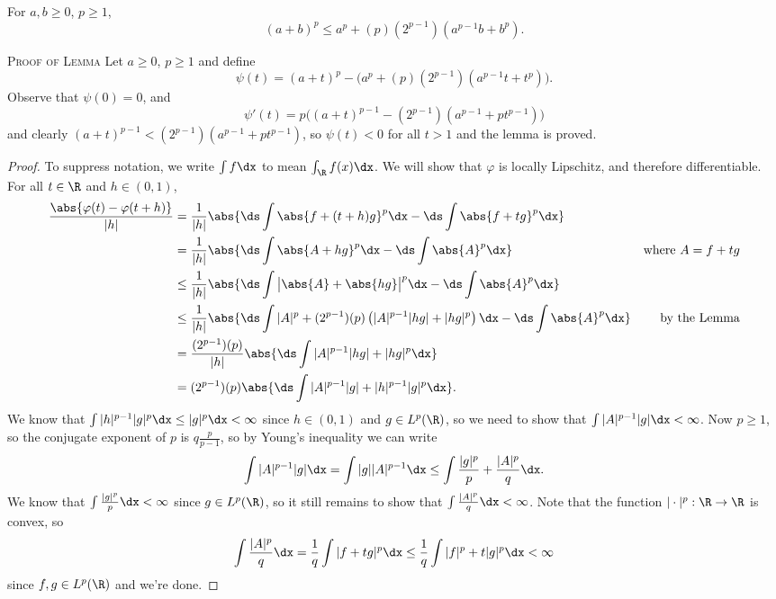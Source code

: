 \documentclass[12pt,letterpaper]{article}
\renewcommand{\phi}{\varphi}
\begin{document}
\begin{lemma}
For $a,b\geq0$, $p\geq1$, 
$$(a+b)^p\leq a^p+(p)(2^{p-1})(a^{p-1}b+b^p).$$
\end{lemma}
\textsc{Proof of Lemma} Let $a\geq0$, $p\geq1$ and define 
$$\psi(t)=(a+t)^p- \big(a^p+(p)(2^{p-1})(a^{p-1}t+t^p)\big).$$
Observe that $\psi(0)=0$, and 
$$\psi'(t)=p\big((a+t)^{p-1}- (2^{p-1})(a^{p-1}+pt^{p-1})\big)$$
and clearly $(a+t)^{p-1} < (2^{p-1})(a^{p-1}+pt^{p-1})$, so $\psi(t)<0$ for all $t>1$ and the lemma is proved. \qedwhite
\begin{proof}To suppress notation, we write $\int f\dx$ to mean $\int_\R f(x)\dx$. 
We will show that $\phi$ is locally Lipschitz, and therefore differentiable. For all $t\in \R$ and $h\in(0,1)$, 
\begin{align*}
\frac{\abs{\phi(t)-\phi(t+h)}}{|h|}
&=\frac{1}{|h|}{\abs{\ds\int\abs{f+(t+h)g}^p\dx - \ds\int\abs{f+tg}^p\dx}} \\
&=\frac{1}{|h|}{\abs{\ds\int\abs{A+hg}^p\dx - \ds\int\abs{A}^p\dx}} &\text{where }A=f+tg\\
&\leq\frac{1}{|h|}{\abs{\ds\int\big|\abs{A}+\abs{hg}\big|^p\dx - \ds\int\abs{A}^p\dx}} \\
&\leq\frac{1}{|h|}{\abs{\ds\int|A|^p+(2^{p-1})(p)\left(|A|^{p-1}|hg|+|hg|^p\right)\dx - \ds\int\abs{A}^p\dx}} &\text{by the Lemma}\\
&=\frac{(2^{p-1})(p)}{|h|}{\abs{\ds\int|A|^{p-1}|hg|+|hg|^p\dx}} \\
&={(2^{p-1})(p)}{\abs{\ds\int|A|^{p-1}|g|+|h|^{p-1}|g|^p\dx}}. \\
\end{align*}
We know that $\int|h|^{p-1}|g|^p\dx\leq |g|^p\dx<\infty$ since $h\in(0,1)$ and $g\in L^p(\R)$, so we need to show that $\int|A|^{p-1}|g|\dx<\infty$. Now $p\geq 1$, so the conjugate exponent of $p$ is $q\frac{p}{p-1}$, so by Young's inequality we can write 
$$\int|A|^{p-1}|g|\dx=\int|g||A|^{p-1}\dx\leq \int\frac{|g|^p}{p}+\frac{|A|^{p}}{q}\dx.$$
We know that $\int\frac{|g|^p}{p}\dx<\infty$ since $g\in L^p(\R)$, so it still remains to show that $\int\frac{|A|^{p}}{q}\dx<\infty$. Note that the function $|\cdot|^p:\R\to\R$ is convex, so 
$$\int\frac{|A|^{p}}{q}\dx=\frac{1}{q}\int{|f+tg|^{p}}\dx\leq\frac{1}{q}\int{|f|^{p}+t|g|^{p}}\dx<\infty$$
since $f,g\in L^p(\R)$ and we're done. 
\end{proof}
\end{document}
